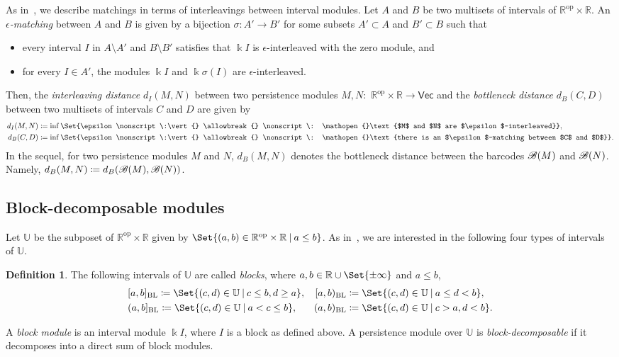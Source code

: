 \documentclass[a4paper,english,reqno]{amsart}
\newcommand{\deff}{\textit}
\renewcommand\k{\Bbbk}
\newcommand\op{^{\mathrm{op}}}
\newcommand\BL{\operatorname{BL}}
\newcommand\bbR{\mathbb{R}}
\newcommand\cU{{\mathbb U}}
\newcommand\RR{\bbR\op\times \bbR}
\newcommand{\cat}[1]{\ensuremath{\mathsf{#1}}}
\renewcommand{\Vec}{\cat{Vec}}
\theoremstyle{plain}
\theoremstyle{definition} %
\newtheorem{definition}[theorem]{Definition}
\providecommand\given{}
\newcommand\SetSymbol[1][]{%
  \nonscript\:#1\vert{}
  \allowbreak{}
  \nonscript\:
  \mathopen{}}
\renewcommand\given{\SetSymbol[]}
\begin{document}
As in~\cite{bjerkevikStabilityIntervalDecomposable2021}, we describe matchings in terms of interleavings between interval modules. Let $A$ and $B$ be two multisets of intervals of $\RR$. An \deff{$\epsilon$-matching} between $A$ and $B$ is given by a bijection $\sigma\colon A'\to B'$ for some subsets $A'\subset A$ and $B'\subset B$ such that
\begin{itemize}
  \item every interval $I$ in $A\setminus A'$ and $B\setminus B'$ satisfies that
        $\k I$ is $\epsilon$-interleaved with the zero module, and
  \item for every $I\in A'$, the modules $\k I$ and $\k\sigma(I)$ are
        $\epsilon$-interleaved.
\end{itemize}
Then, the \deff{interleaving distance} $d_{I}(M, N)$ between two persistence modules $M, N\colon$ $\RR\to\Vec$ and the \deff{bottleneck distance} $d_{B}(C, D)$ between two multisets of intervals $C$ and $D$ are given by
\begin{align*}
  d_{I}(M, N) &\coloneqq \inf\Set{\epsilon \given \text{$M$ and $N$ are $\epsilon$-interleaved}},\\
  d_{B}(C, D) &\coloneqq \inf\Set{\epsilon \given \text{there is an $\epsilon$-matching between $C$ and $D$}}.
\end{align*}
In the sequel, for two persistence modules $M$ and $N$, $d_{B}(M, N)$ denotes the bottleneck distance between the barcodes $\mathcal{B}(M)$ and $\mathcal{B}(N)$. Namely, $d_{B}(M, N)\coloneqq d_{B}(\mathcal{B}(M), \mathcal{B}(N))$.

\subsection{Block-decomposable modules} Let $\cU$ be the subposet of $\RR$ given by $\Set{(a, b)\in \RR \given a\leq b}$. As in~\cite{botnanAlgebraicStabilityZigzag2018,bjerkevikStabilityIntervalDecomposable2021}, we are interested in the following four types of intervals of $\cU$.

\begin{definition}
The following intervals of $\cU$ are called \deff{blocks}, where $a, b\in \bbR\cup\Set{\pm\infty}$ and $a \le b$,
\begin{align*}
&[a,b]_{\BL} \coloneqq \Set{(c, d)\in \cU \given c\le b, d\ge a}, &[a, b)_{\BL} &\coloneqq \Set{(c, d)\in \cU \given a\le d<b},\\
&(a, b]_{\BL} \coloneqq \Set{(c, d)\in \cU \given a<c\le b}, &(a, b)_{\BL} &\coloneqq \Set{(c, d)\in \cU \given c>a, d<b}.
\end{align*}

A \deff{block module} is an interval module $\k I$, where $I$ is a block as defined above. A persistence module over $\cU$ is \deff{block-decomposable} if it decomposes into a direct sum of block modules.
\end{definition}
\end{document}
